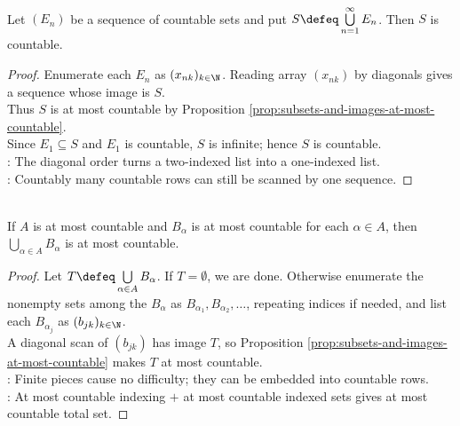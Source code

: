\begin{theorem} \label{thm:countable-union-of-countable-sets}\label{thm:cardinality-main-results-source-todo} \\
Let $(E_n)$ be a sequence of countable sets and put $S\defeq\bigcup\limits_{n=1}^{\infty}E_n$. Then $S$ is countable.
\begin{proof}
Enumerate each $E_n$ as $(x_{nk})_{k\in\N}$. Reading array $(x_{nk})$ by diagonals gives a sequence whose image is $S$.\\
Thus $S$ is at most countable by Proposition \ref{prop:subsets-and-images-at-most-countable}.\\
Since $E_1\subseteq S$ and $E_1$ is countable, $S$ is infinite; hence $S$ is countable.\\
: The diagonal order turns a two-indexed list into a one-indexed list.\\
: Countably many countable rows can still be scanned by one sequence.
\end{proof}
\end{theorem}

\begin{corollary} \label{cor:at-most-countable-union-at-most-countable} \\
If $A$ is at most countable and $B_\alpha$ is at most countable for each $\alpha\in A$, then $\bigcup\limits_{\alpha\in A}B_\alpha$ is at most countable.
\begin{proof}
Let $T\defeq\bigcup\limits_{\alpha\in A}B_\alpha$. If $T=\emptyset$, we are done. Otherwise enumerate the nonempty sets among the $B_\alpha$ as $B_{\alpha_1},B_{\alpha_2},\ldots$, repeating indices if needed, and list each $B_{\alpha_j}$ as $(b_{jk})_{k\in\N}$.\\
A diagonal scan of $(b_{jk})$ has image $T$, so Proposition \ref{prop:subsets-and-images-at-most-countable} makes $T$ at most countable.\\
: Finite pieces cause no difficulty; they can be embedded into countable rows.\\
: At most countable indexing $+$ at most countable indexed sets gives at most countable total set.
\end{proof}
\end{corollary}

